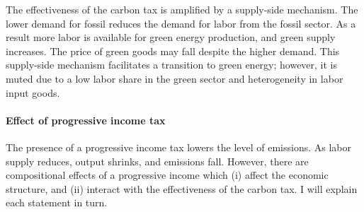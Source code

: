  The effectiveness of the carbon tax is amplified by a supply-side mechanism. 
 The lower demand for fossil reduces the demand for labor from the fossil sector. As a result more labor is available for green energy production, and green supply increases. The price of green goods may fall despite the higher demand. This supply-side mechanism facilitates a transition to green energy; however, it is muted due to a low labor share in the green sector and heterogeneity in labor input goods.


\paragraph{Effect of progressive income tax}
 
 The presence of a progressive income tax lowers the level of emissions. As labor supply reduces, output shrinks, and emissions fall. 
 However, there are compositional effects of a progressive income which (i) affect the economic structure, and (ii) interact with the effectiveness of the carbon tax. I will explain each statement in turn. 
 
